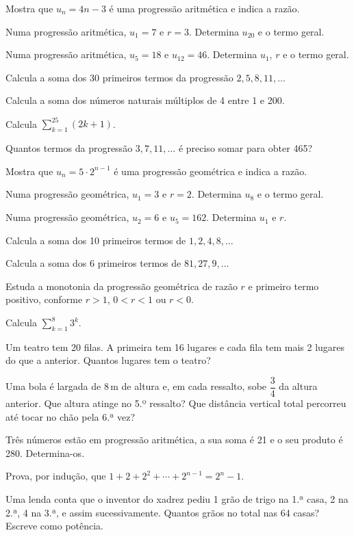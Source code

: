 \documentclass[12pt]{article}
\begin{document}
\begin{exercicios}
  \item Mostra que $u_n = 4n - 3$ é uma progressão aritmética e indica a razão.
  \item Numa progressão aritmética, $u_1 = 7$ e $r = 3$. Determina $u_{20}$ e o termo geral.
  \item Numa progressão aritmética, $u_5 = 18$ e $u_{12} = 46$. Determina $u_1$, $r$ e o termo geral.
  \item Calcula a soma dos 30 primeiros termos da progressão $2, 5, 8, 11, \ldots$
  \item Calcula a soma dos números naturais múltiplos de 4 entre 1 e 200.
  \item Calcula $\displaystyle\sum_{k=1}^{25} (2k + 1)$.
  \item Quantos termos da progressão $3, 7, 11, \ldots$ é preciso somar para obter 465?
\end{exercicios}

\begin{exercicios}
  \item Mostra que $u_n = 5 \cdot 2^{n-1}$ é uma progressão geométrica e indica a razão.
  \item Numa progressão geométrica, $u_1 = 3$ e $r = 2$. Determina $u_8$ e o termo geral.
  \item Numa progressão geométrica, $u_2 = 6$ e $u_5 = 162$. Determina $u_1$ e $r$.
  \item Calcula a soma dos 10 primeiros termos de $1, 2, 4, 8, \ldots$
  \item Calcula a soma dos 6 primeiros termos de $81, 27, 9, \ldots$
  \item Estuda a monotonia da progressão geométrica de razão $r$ e primeiro termo positivo, conforme $r > 1$, $0 < r < 1$ ou $r < 0$.
  \item Calcula $\displaystyle\sum_{k=1}^{8} 3^{k}$.
\end{exercicios}

\begin{exercicios}
  \item Um teatro tem 20 filas. A primeira tem 16 lugares e cada fila tem mais 2 lugares do que a anterior. Quantos lugares tem o teatro?
  \item Uma bola é largada de 8\,m de altura e, em cada ressalto, sobe $\dfrac{3}{4}$ da altura anterior. Que altura atinge no 5.º ressalto? Que distância vertical total percorreu até tocar no chão pela 6.ª vez?
  \item Três números estão em progressão aritmética, a sua soma é 21 e o seu produto é 280. Determina-os.
  \item Prova, por indução, que $1 + 2 + 2^2 + \cdots + 2^{n-1} = 2^n - 1$.
  \item Uma lenda conta que o inventor do xadrez pediu 1 grão de trigo na 1.ª casa, 2 na 2.ª, 4 na 3.ª, e assim sucessivamente. Quantos grãos no total nas 64 casas? Escreve como potência.
\end{exercicios}
\end{document}
